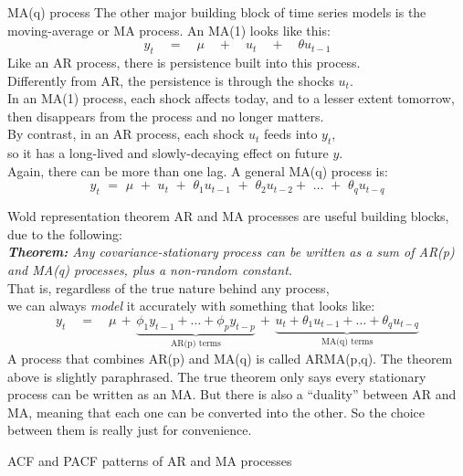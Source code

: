 \documentclass[t,12pt]{beamer}
\begin{document}
\begin{frame}[c]{MA(q) process}
The other major building block of time series models is the moving-average or MA process. 
An MA(1) looks like this:
$$
y_t \quad = \quad \mu \quad + \quad u_t \quad + \quad \theta u_{t-1}
$$
Like an AR process, there is persistence built into this process.
\\ 
Differently from AR, the persistence is through the shocks $u_t$.
\\ \medskip
In an MA(1) process, each shock affects today, and to a lesser extent tomorrow, then disappears from the process and no longer matters.
\\ \medskip
By contrast, in an AR process, each shock $u_t$ feeds into $y_t$, 
\\ so it has a long-lived and slowly-decaying effect on future $y$.
\\ \medskip
Again, there can be more than one lag. A general MA(q) process is:
$$
y_t \,\, = \,\, \mu \,\, + \,\, u_t \,\, + \,\, \theta_1 u_{t-1} \,\, + \,\, \theta_2 u_{t-2} + \,\, \dots \,\, + \,\, \theta_q u_{t-q}
$$
\end{frame}

\begin{frame}[c]{Wold representation theorem}
AR and MA processes are useful building blocks, due to the following:
\\ \medskip
\emph{ \textbf{Theorem:} Any covariance-stationary process can be written as a sum of AR(p) and MA(q) processes, plus a non-random constant.}
\\ \medskip
That is, regardless of the true nature behind any process, 
\\ we can always \emph{model} it accurately with something that looks like:
\begin{equation*}
y_t \quad = \quad \mu \, + \, 
\underbrace{ \phi_1 y_{t-1} + \dots + \phi_p y_{t-p} }_{\text{AR(p) terms}}
\, + \,
\underbrace{ u_t + \theta_1 u_{t-1} + \dots + \theta_q u_{t-q} }_{\text{MA(q) terms}}
\end{equation*}
A process that combines AR(p) and MA(q) is called ARMA(p,q).
\vfill
{\scriptsize
The theorem above is slightly paraphrased.
The true theorem only says every stationary process can be written as an MA.
But there is also a ``duality'' between AR and MA, meaning that each one can be converted into the other.
So the choice between them is really just for convenience.
}
\end{frame}

\begin{frame}[c]
\vfill
\centerline{ACF and PACF patterns of AR and MA processes}
\vfill
\end{frame}
\end{document}
